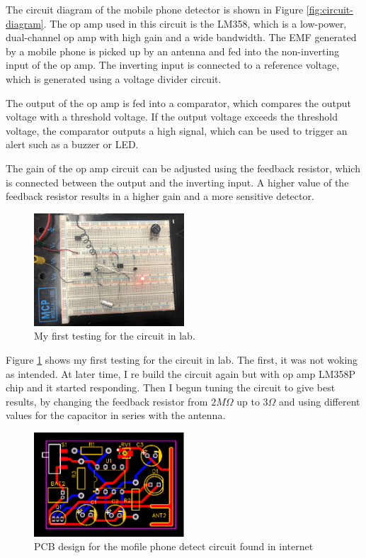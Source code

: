 \documentclass[a4paper, 11pt]{report}
\begin{document}
The circuit diagram of the mobile phone detector is shown in Figure \ref{fig:circuit-diagram}.
The op amp used in this circuit is the LM358, which is a low-power, dual-channel op amp with high gain and a wide bandwidth. The EMF generated by a mobile phone is picked up by an antenna and fed into the non-inverting input of the op amp. The inverting input is connected to a reference voltage, which is generated using a voltage divider circuit.

The output of the op amp is fed into a comparator, which compares the output voltage with a threshold voltage. If the output voltage exceeds the threshold voltage, the comparator outputs a high signal, which can be used to trigger an alert such as a buzzer or LED.

The gain of the op amp circuit can be adjusted using the feedback resistor, which is connected between the output and the inverting input. A higher value of the feedback resistor results in a higher gain and a more sensitive detector.

\begin{figure}[ht]
	\centering
	\includegraphics[width=0.5\textwidth]{breadboard.jpeg}
	\caption{My first testing for the circuit in lab.}
	\label{fig:breadboard}
\end{figure}

Figure \ref{fig:breadboard} shows my first testing for the circuit in lab. The first, it was not woking as intended.
At later time, I re build the circuit again but with op amp LM358P chip and it started responding. Then I begun
tuning the circuit to give best results, by changing the feedback resistor from $2M\Omega$ up to $3\Omega$ and
using different values for the capacitor in series with the antenna.

\begin{figure}[ht]
	\centering
	\includegraphics[width=0.5\textwidth]{Mobile-Phone-Detector-PCB.png}
	\caption{PCB design for the mofile phone detect circuit found in internet}
	\label{fig:PCB}
\end{figure}
\end{document}
